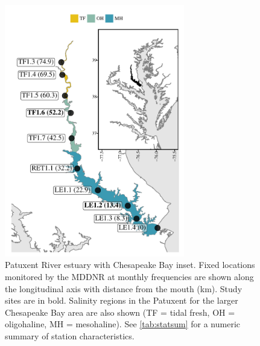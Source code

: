 \documentclass[letterpaper,12pt,oneside]{article}\usepackage[]{graphicx}\usepackage[]{color}
\begin{document}
\begin{figure}[!ht]

{\centering \includegraphics[width=0.7\textwidth]{figs/map-1} 

}

\caption{Patuxent River estuary with Chesapeake Bay inset. Fixed locations monitored by the \acl{MDDNR} at monthly frequencies are shown along the longitudinal axis with distance from the mouth (km).  Study sites are in bold. Salinity regions in the Patuxent for the larger Chesapeake Bay area are also shown (TF = tidal fresh, OH = oligohaline, MH = mesohaline). See \cref{tab:statsum} for a numeric summary of station characteristics.}\label{fig:map}
\end{figure}
\end{document}
